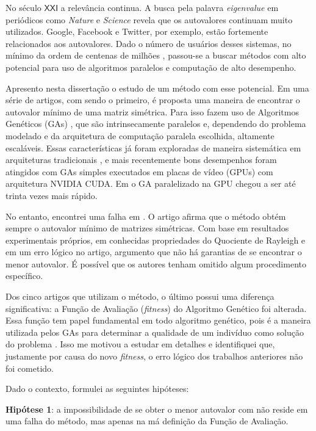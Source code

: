 	No século $\mathsf{XXI}$ a relevância continua. A busca pela palavra \emph{eigenvalue} em periódicos como \emph{Nature} e \emph{Science} revela que os autovalores continuam muito utilizados. Google, Facebook e Twitter, por exemplo, estão fortemente relacionados aos autovalores. Dado o número de usuários desses sistemas, no mínimo da ordem de centenas de milhões \cite{twitter2010}, passou-se a buscar métodos com alto potencial para uso de algoritmos paralelos e computação de alto desempenho.
	
	Apresento nesta dissertação o estudo de um método com esse potencial. Em uma série de artigos, com \cite{metodo2004} sendo o primeiro, é proposta uma maneira de encontrar o autovalor mínimo de uma matriz simétrica. Para isso fazem uso de Algoritmos Genéticos (GAs) \cite{Mitchell98}, que são intrinsecamente paralelos \cite{Linden2008} e, dependendo do problema modelado e da arquitetura de computação paralela escolhida, altamente escaláveis. Essas características já foram exploradas de maneira sistemática em arquiteturas tradicionais \cite{Cantu-Paz2000}, e mais recentemente bons desempenhos foram atingidos com GAs simples executados em placas de vídeo (GPUs) com arquitetura NVIDIA CUDA. Em \cite{onemaxNaGPU} o GA paralelizado na GPU chegou a ser até trinta vezes mais rápido.
	
	No entanto, encontrei uma falha em \cite{metodo2004}. O artigo afirma que o método obtém sempre o autovalor mínimo de matrizes simétricas. Com base em resultados experimentais próprios, em conhecidas propriedades do Quociente de Rayleigh e em um erro lógico no artigo, argumento que não há garantias de se encontrar o menor autovalor. É possível que os autores tenham omitido algum procedimento específico.
	
	Dos cinco artigos que utilizam o método, o último \cite{metodo2011} possui uma diferença significativa: a Função de Avaliação (\emph{fitness}) do Algoritmo Genético foi alterada. Essa função tem papel fundamental em todo algoritmo genético, pois é a maneira utilizada pelos GAs para determinar a qualidade de um indivíduo como solução do problema \cite{Linden2008}. Isso me motivou a estudar \cite{metodo2011} em detalhes e identifiquei que, justamente por causa do novo \emph{fitness}, o erro lógico dos trabalhos anteriores não foi cometido.
	
	Dado o contexto, formulei as seguintes hipóteses:
	
	\textbf{Hipótese 1}: a impossibilidade de se obter o menor autovalor com \cite{metodo2004} não reside em uma falha do método, mas apenas na má definição da Função de Avaliação.
	
